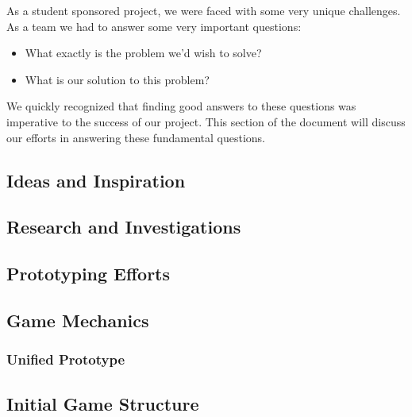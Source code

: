 As a student sponsored project, we were faced with some very unique
challenges. As a team we had to answer some very important questions: 

\begin{itemize}
    \item What exactly is the problem we'd wish to solve?
    \item What is our solution to this problem?
\end{itemize}

We quickly recognized that finding good answers to these questions was imperative to the success of our project. 
This section of the document will discuss our efforts in answering these fundamental questions.

\subsection{Ideas and Inspiration}
    
\newpage

\subsection{Research and Investigations}
  
\newpage

\subsection{Prototyping Efforts}
  
\newpage

\subsection{Game Mechanics}
\subsubsection{Unified Prototype}
\subsection{Initial Game Structure}

\newpage
